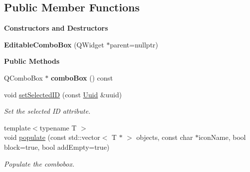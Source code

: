\subsection*{Public Member Functions}
\begin{Indent}\textbf{ Constructors and Destructors}\par
\begin{DoxyCompactItemize}
\item 
\mbox{\label{classrev_1_1_view_1_1_editable_combo_box_a17a01b075a38ebb2127a111f053a4f62}} 
{\bfseries Editable\+Combo\+Box} (Q\+Widget $\ast$parent=nullptr)
\end{DoxyCompactItemize}
\end{Indent}
\begin{Indent}\textbf{ Public Methods}\par
\begin{DoxyCompactItemize}
\item 
\mbox{\label{classrev_1_1_view_1_1_editable_combo_box_a6e10d3def808ceeb0b2455ed77bb619e}} 
Q\+Combo\+Box $\ast$ {\bfseries combo\+Box} () const
\item 
\mbox{\label{classrev_1_1_view_1_1_editable_combo_box_a5dc238e20383f7240bffa6ed8e288d44}} 
void \mbox{\hyperlink{classrev_1_1_view_1_1_editable_combo_box_a5dc238e20383f7240bffa6ed8e288d44}{set\+Selected\+ID}} (const \mbox{\hyperlink{classrev_1_1_uuid}{Uuid}} \&uuid)
\begin{DoxyCompactList}\small\item\em Set the selected ID attribute. \end{DoxyCompactList}\item 
\mbox{\label{classrev_1_1_view_1_1_editable_combo_box_a136a3c9f96d984a81adf8ed5c57a2efa}} 
{\footnotesize template$<$typename T $>$ }\\void \mbox{\hyperlink{classrev_1_1_view_1_1_editable_combo_box_a136a3c9f96d984a81adf8ed5c57a2efa}{populate}} (const std\+::vector$<$ T $\ast$ $>$ objects, const char $\ast$icon\+Name, bool block=true, bool add\+Empty=true)
\begin{DoxyCompactList}\small\item\em Populate the combobox. \end{DoxyCompactList}\end{DoxyCompactItemize}
\end{Indent}
